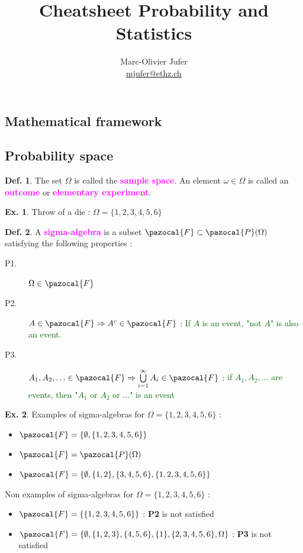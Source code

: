 \documentclass[8pt,a4paper,landscape]{article}
\author{Marc-Olivier Jufer \\ \href{mailto:mjufer@ethz.ch}{mjufer@ethz.ch}}
\title{Cheatsheet Probability and Statistics}
\theoremstyle{definition}
\newtheorem{definition}{Def.}[section]
\theoremstyle{example}
\newtheorem{example}{Ex.}[section]
\theoremstyle{intuition}
\theoremstyle{definition}
\newcommand{\Fb}{\pazocal{F}}
\newcommand{\Pb}{\pazocal{P}}
\newcommand{\mydef}[1]{\textcolor{magenta}{\textbf{#1}}}
\begin{document}
\begin{multicols}{3}
	\maketitle
	
	
	\section{Mathematical framework}
			\subsection{Probability space}
			
			
				\begin{definition}
					The set $\Omega$ is called the \mydef{sample space}. An element $\omega \in \Omega$ is called an \mydef{outcome} or \mydef{elementary experiment}.
				\end{definition}
				\begin{example}
					Throw of a die : $\Omega = \{1,2,3,4,5,6\}$
				\end{example}
				
				
				\begin{definition} \label{dsa}
					A \mydef{sigma-algebra} is a subset $\Fb \subset \Pb (\Omega)$ satisfying the following properties :
					\begin{description}
						\item[P1.] $\Omega \in \Fb$
						\item[P2.] $A \in \Fb \Rightarrow A^c \in \Fb$ : \textcolor{DarkGreen}{If $A$ is an event, "not $A$" is also an event.}
						\item[P3.] $A_1, A_2, \ldots \in \Fb \Rightarrow \bigcup\limits_{i=1}^{\infty}A_i \in \Fb$ : \textcolor{DarkGreen}{if $A_1, A_2, \ldots$ are events, then "$A_1$ or $A_2$ or $\ldots$" is an event}
					\end{description}
				\end{definition}
				\begin{example}
					Examples of sigma-algebras for $\Omega = \{1,2,3,4,5,6\}$ :
					\begin{itemize}
						\item $\Fb = \{\emptyset, \{1,2,3,4,5,6\}\}$
						\item $\Fb = \Pb(\Omega)$
						\item $\Fb = \{\emptyset, \{1,2\}, \{3,4,5,6\}, \{1,2,3,4,5,6\}\}$
					\end{itemize}
					Non examples of sigma-algebras for $\Omega = \{1,2,3,4,5,6\}$ :
					\begin{itemize}
						\item $\Fb  = \{\{1,2,3,4,5,6\}\}$ : \textbf{P2} is not satisfied
						\item $\Fb = \{\emptyset, \{1,2,3\},\{4,5,6\},\{1\},\{2,3,4,5,6\},\Omega\}$ : \textbf{P3} is not satisfied
					\end{itemize}
				\end{example}
				

\end{multicols}
\end{document}
